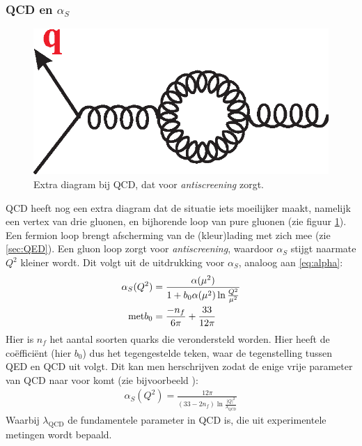 \documentclass[a4paper,11pt]{article}
\numberwithin{equation}{section} %
\begin{document}
    \subsubsection{QCD en $\alpha_S$}
\begin{figure} [H]
  \begin{center}
    \includegraphics[scale=.33]{Afbeeldingen/GluonLoop.eps}
    \caption{Extra diagram bij QCD, dat voor \textit{antiscreening} zorgt. \cite{Martin}}
   \label{fig:GluonLoop}
  \end{center}
\end{figure}
QCD heeft nog een extra diagram dat de situatie iets moeilijker maakt, namelijk een vertex van drie gluonen, en bijhorende loop van pure gluonen (zie figuur \ref{fig:GluonLoop}).
Een fermion loop brengt afscherming van de (kleur)lading met zich mee (zie \ref{sec:QED}).
Een gluon loop zorgt voor \textit{antiscreening}, waardoor  $\alpha_S$ stijgt naarmate $Q^2$ kleiner wordt.
Dit volgt uit de uitdrukking voor $\alpha_S$, analoog aan \eqref{eq:alpha}:
\begin{align}
\alpha_S( Q^2 ) &=\frac{\alpha(\mu^2)}{1+b_0 \alpha(\mu^2) \ln{\frac{Q^2}{\mu^2}}} \\
\text{met} b_0 &= \frac{-n_f}{6\pi} + \frac{33}{12\pi} \notag
\end{align}
Hier is $n_f$ het aantal soorten quarks die verondersteld worden.
Hier heeft de coëfficiënt (hier $b_0$) dus het tegengestelde teken, waar de tegenstelling tussen QED en QCD uit volgt.
Dit kan men herschrijven zodat de enige vrije parameter van QCD naar voor komt (zie bijvoorbeeld \cite[sectie 6.6]{Bettini}):
\begin{align} \label{eq:runningAlphaS}
\alpha_S(Q^2) = \frac{12\pi}{(33-2n_f) \ln{\frac{|Q|^2}{\lambda_\text{QCD}}}}
\end{align}
Waarbij $\lambda_\text{QCD}$ de fundamentele parameter in QCD is, die uit experimentele metingen wordt bepaald.
\end{document}
